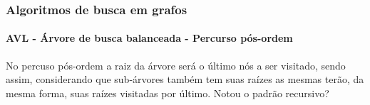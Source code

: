 \begin{frame}
	\frametitle{Algoritmos de busca em grafos}
	\framesubtitle{AVL - Árvore de busca balanceada - Percurso pós-ordem}
	\par No percuso pós-ordem a raiz da árvore será o último nós a ser visitado, sendo assim, considerando que sub-árvores também tem suas raízes as mesmas terão, da mesma forma, suas raízes visitadas por último. Notou o padrão recursivo?
	
\end{frame}
